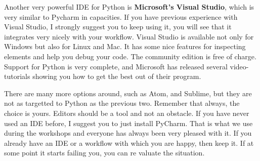 Another very powerful IDE for Python is \textbf{Microsoft’s Visual Studio}, which is very similar to Pycharm in capacities. If you have previous experience with Visual Studio, I strongly suggest you to keep using it, you will see that it integrates very nicely with your workflow. Visual Studio is available not only for Windows but also for Linux and Mac. It has some nice features for inspecting elements and help you debug your code. The community edition is free of charge. Support for Python is very complete, and Microsoft has released several video-tutorials showing you how to get the best out of their program. 

There are many more options around, such as Atom, and Sublime, but they are not as targetted to Python as the previous two. Remember that always, the choice is yours. Editors should be a tool and not an obstacle. If you have never used an IDE before, I suggest you to just install PyCharm. That is what we use during the workshops and everyone has always been very pleased with it. If you already have an IDE or a workflow with which you are happy, then keep it. If at some point it starts failing you, you can re valuate the situation.  

